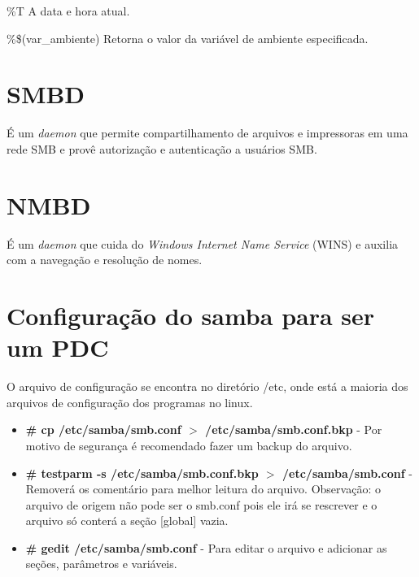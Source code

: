 \%T
A data e hora atual.

\%\$(var\_ambiente)
Retorna o valor da variável de ambiente especificada.

\section{SMBD}

É um \textit{daemon} que permite compartilhamento de arquivos e impressoras em uma rede SMB e provê autorização e autenticação a usuários SMB. \cite{SAMBA}

\section{NMBD}

É um \textit{daemon} que cuida do \textit{Windows Internet Name Service} (WINS) e auxilia com a navegação e resolução de nomes.
\cite{SAMBA}

\section{Configuração do samba para ser um PDC}

O arquivo de configuração se encontra no diretório /etc, onde está a maioria dos arquivos de configuração dos programas no linux.

\begin{itemize}
	\item \textbf{\# cp /etc/samba/smb.conf $>$ /etc/samba/smb.conf.bkp} - Por motivo de segurança é recomendado fazer um backup do arquivo.	
	\item \textbf{\# testparm -s /etc/samba/smb.conf.bkp $>$ /etc/samba/smb.conf} - Removerá os comentário para melhor leitura do arquivo. Observação: o arquivo de origem não pode ser o smb.conf pois ele irá se rescrever e o arquivo só conterá a seção [global] vazia.  
	\item \textbf{\# gedit /etc/samba/smb.conf} - Para editar o arquivo e adicionar as seções, parâmetros e variáveis.
\end{itemize}

